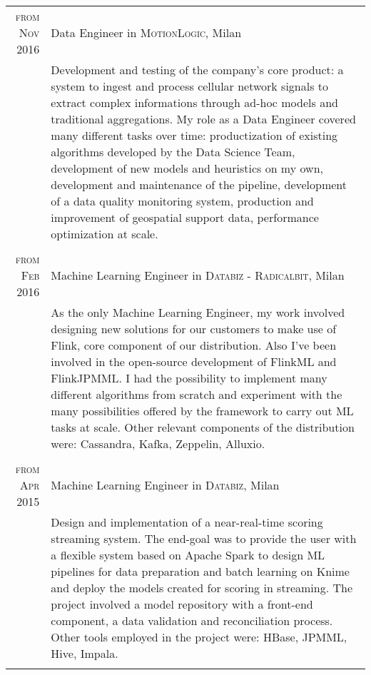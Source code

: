 \documentclass[a4paper,10pt]{article} %
\begin{document}
\begin{tabular}{r|p{11cm}}
\textsc{from Nov 2016} & Data Engineer in \textsc{MotionLogic}, Milan \emph{}\\
& \footnotesize{Development and testing of the company's core product: a system to ingest and process cellular network signals to extract complex informations through ad-hoc models and traditional aggregations. My role as a Data Engineer covered many different tasks over time: productization of existing algorithms developed by the Data Science Team, development of new models and heuristics on my own, development and maintenance of the pipeline, development of a data quality monitoring system, production and improvement of geospatial support data, performance optimization at scale.}\\
\multicolumn{1}{c}{} \\
	
\textsc{from Feb 2016} & Machine Learning Engineer in \textsc{Databiz - Radicalbit}, Milan \emph{}\\
& \footnotesize{As the only Machine Learning Engineer, my work involved designing new solutions for our customers to make use of Flink, core component of our distribution. Also I've been involved in the open-source development of FlinkML and FlinkJPMML. I had the possibility to implement many different algorithms from scratch and experiment with the many possibilities offered by the framework to carry out ML tasks at scale. Other relevant components of the distribution were: Cassandra, Kafka, Zeppelin, Alluxio.}\\
\multicolumn{2}{c}{} \\

\textsc{from Apr 2015} & Machine Learning Engineer in \textsc{Databiz}, Milan \emph{}\\
& \footnotesize{Design and implementation of a near-real-time scoring streaming system. The end-goal was to provide the user with a flexible system based on Apache Spark to design ML pipelines for data preparation and batch learning on Knime and deploy the models created for scoring in streaming. The project involved a model repository with a front-end component, a data validation and reconciliation process. Other tools employed in the project were: HBase, JPMML, Hive, Impala.}\\
\multicolumn{2}{c}{} \\

\end{tabular}

\end{document}
